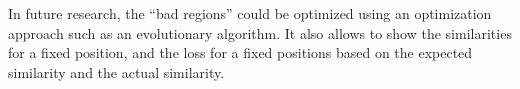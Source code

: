 In future research, the ``bad regions'' could be optimized using an
optimization approach such as an evolutionary algorithm. It also
allows to show the similarities for a fixed position, and the loss for
a fixed positions based on the expected similarity and the actual
similarity.